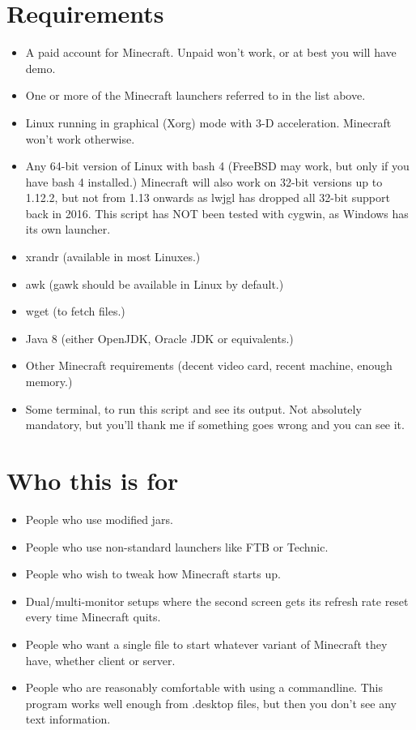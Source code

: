 \documentclass[10pt,a4paper]{book}
\begin{document}
\section*{Requirements}
\begin{itemize}
  \item A paid account for Minecraft. Unpaid won't work, or at best you will have demo.
  \item One or more of the Minecraft launchers referred to in the list above.
  \item Linux running in graphical (Xorg) mode with 3-D acceleration. Minecraft won't work otherwise.
  \item Any 64-bit version of Linux with bash 4 (FreeBSD may work, but only if you have bash 4 installed.) Minecraft will also work on 32-bit versions up to 1.12.2, but not from 1.13 onwards as lwjgl has dropped all 32-bit support back in 2016. This script has NOT been tested with cygwin, as Windows has its own launcher.
  \item xrandr (available in most Linuxes.)
  \item awk (gawk should be available in Linux by default.)
  \item wget (to fetch files.)
  \item Java 8 (either OpenJDK, Oracle JDK or equivalents.)
  \item Other Minecraft requirements (decent video card, recent machine, enough memory.)
  \item Some terminal, to run this script and see its output. Not absolutely mandatory, but you'll thank me if something goes wrong and you can see it.
\end{itemize}

\section*{Who this is for}
\begin{itemize}
\item People who use modified jars.
\item People who use non-standard launchers like FTB or Technic.
\item People who wish to tweak how Minecraft starts up.
\item Dual/multi-monitor setups where the second screen gets its refresh rate reset every time
  Minecraft quits.
\item People who want a single file to start whatever variant of Minecraft they have,
  whether client or server.
\item People who are reasonably comfortable with using a commandline. This program
  works well enough from .desktop files, but then you don't see any text information.
\end{itemize}
\end{document}
